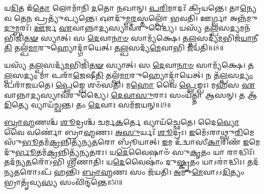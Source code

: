 𑌯\-\ul{𑌦𑌿}\-𑌤 𑌇᳴\-\ul{𑌤𑍋} 𑌲𑍋𑌮𑌾᳴𑌨𑌿 \ul{𑌦}\-𑌤𑍋 \ul{𑌨}\-𑌖𑌾𑌨𑍍।
\-\ul{𑌪}\-\-\ul{𑌰𑌿}\-𑌮𑌾𑌦𑌃᳴ 𑌕𑍍𑌰𑌿𑌯𑌨𑍍𑌤𑍇।
𑌤𑌾\-\ul{𑌨𑍍𑌯𑍇}\-𑌵 𑌤𑍇\-\ul{𑌨} 𑌪𑍍𑌰𑌤𑍍𑌯𑍁᳴𑌪𑍍𑌯𑌨𑍍𑌤𑍇।
𑌔𑌦𑍁᳴𑌮𑍍𑌬\-\ul{𑌰}\-𑌸𑍍𑌤𑌲𑍍𑌪𑍋᳴ 𑌭𑌵𑌤𑌿।
𑌊𑌰𑍍𑌗𑍍𑌵𑌾 𑌅𑌨𑍍𑌨᳴𑌮𑍁\-\ul{𑌦𑍁}\-𑌮𑍍𑌬𑌰𑌃᳴।
\-\ul{𑌊}\-𑌰𑍍𑌜 \ul{𑌏}\-𑌵𑌾𑌨𑍍𑌨𑌾\-\ul{𑌦𑍍𑌯}\-𑌸𑍍𑌯𑌾𑌵᳴𑌰𑍁𑌦𑍍𑌧𑍍𑌯𑍈।
𑌯𑌸𑍍𑌯᳴ 𑌤\-\ul{𑌲𑍍𑌪}\-𑌸\-\ul{𑌦𑍍𑌯}\-𑌮𑌨᳴𑌭𑌿𑌜𑌿\-\ul{𑌤}\-\-\ul{𑍟} 𑌸𑍍𑌯𑌾𑌤𑍍।
𑌸 \ul{𑌦𑍇}\-𑌵𑌾\-\ul{𑌨𑌾}\-\-\ul{𑍞} 𑌸𑌾𑌮𑍍𑌯᳴𑌕𑍍𑌷𑍇।
\-\ul{𑌤}\-\-\ul{𑌲𑍍𑌪}\-𑌸𑌦𑍍𑌯᳴\-\ul{𑌮}\-𑌭𑌿𑌜᳴\-\ul{𑌯𑌾}\-𑌨𑍀\-\ul{𑌤𑌿} 𑌤𑌲𑍍𑌪᳴\-\ul{𑌮𑌾}\-𑌰𑍁𑌹𑍍𑌯𑍋𑌦𑍍𑌗𑌾᳴𑌯𑍇𑌤𑍍।
\-\ul{𑌤}\-\-\ul{𑌲𑍍𑌪}\-𑌸𑌦𑍍𑌯᳴\-\ul{𑌮𑍇}\-𑌵𑌾𑌭𑌿 𑌜᳴𑌯𑌤𑌿॥48॥

𑌯𑌸𑍍𑌯᳴ 𑌤\-\ul{𑌲𑍍𑌪}\-𑌸𑌦𑍍𑌯᳴\-\ul{𑌮}\-𑌭𑌿𑌜𑌿᳴\-\ul{𑌤}\-\-\ul{𑍟} 𑌸𑍍𑌯𑌾𑌤𑍍।
𑌸 \ul{𑌦𑍇}\-𑌵𑌾\-\ul{𑌨𑌾}\-\-\ul{𑍞} 𑌸𑌾𑌮𑍍𑌯᳴𑌕𑍍𑌷𑍇।
\-\ul{𑌤}\-\-\ul{𑌲𑍍𑌪}\-𑌸\-\ul{𑌦𑍍𑌯𑌂} 𑌮𑌾 𑌪𑌰𑌾᳴\-\ul{𑌜𑍇}\-𑌷𑍀\-\ul{𑌤𑌿} 𑌤𑌲𑍍𑌪᳴\-\ul{𑌮𑌾}\-𑌰𑍁𑌹𑍍𑌯𑍋𑌦𑍍𑌗𑌾᳴𑌯𑍇𑌤𑍍।
𑌨 𑌤᳴\-\ul{𑌲𑍍𑌪}\-𑌸\-\ul{𑌦𑍍𑌯𑌂} 𑌪𑌰𑌾᳴𑌜𑌯𑌤𑍇।
\-\ul{𑌪𑍍𑌲𑍇}\-𑌙𑍍𑌖𑍇 𑌶𑍞᳴𑌸𑌤𑌿।
𑌮\-\ul{𑌹𑍋} 𑌵𑍈 \ul{𑌪𑍍𑌲𑍇}\-𑌙𑍍𑌖𑌃।
𑌮𑌹᳴𑌸 \ul{𑌏}\-𑌵𑌾𑌨𑍍𑌨𑌾\-\ul{𑌦𑍍𑌯}\-𑌸𑍍𑌯𑌾𑌵᳴𑌰𑍁𑌦𑍍𑌧𑍍𑌯𑍈।
\-\ul{𑌦𑍇}\-\-\ul{𑌵𑌾}\-\-\ul{𑌸𑍁}\-𑌰𑌾𑌃 𑌸𑌂𑌯᳴𑌤𑍍𑌤𑌾 𑌆𑌸𑌨𑍍।
𑌤 𑌆᳴\-\ul{𑌦𑌿}\-𑌤𑍍𑌯𑍇 𑌵𑍍𑌯𑌾𑌯᳴𑌚𑍍𑌛𑌨𑍍𑌤।
𑌤𑌂 \ul{𑌦𑍇}\-𑌵𑌾𑌃 𑌸𑌮᳴𑌜𑌯𑌨𑍍॥49॥

\-\ul{𑌬𑍍𑌰𑌾}\-\-\ul{𑌹𑍍𑌮}\-𑌣𑌶𑍍𑌚᳴ \ul{𑌶𑍂}\-𑌦𑍍𑌰𑌶𑍍𑌚᳴ 𑌚𑌰𑍍𑌮\-\ul{𑌕}\-𑌰𑍍𑌤𑍇 𑌵𑍍𑌯𑌾𑌯᳴𑌚𑍍𑌛𑍇𑌤𑍇।
𑌦𑍈\-\ul{𑌵𑍍𑌯𑍋} 𑌵𑍈 𑌵𑌰𑍍𑌣𑍋॑ 𑌬𑍍𑌰𑌾\-\ul{𑌹𑍍𑌮}\-𑌣𑌃।
\-\ul{𑌅}\-\-\ul{𑌸𑍁}\-𑌰𑍍𑌯𑌃᳴ \ul{𑌶𑍂}\-𑌦𑍍𑌰𑌃।
\-\ul{𑌇}\-𑌮𑍇᳴\-𑌽𑌰𑌾𑌥𑍍𑌸𑍁\-\ul{𑌰𑌿}\-𑌮𑍇 𑌸𑍁᳴\-\ul{𑌭𑍂}\-𑌤𑌮᳴\-\ul{𑌕𑍍𑌰}\-𑌨𑍍𑌨𑌿𑌤𑍍𑌯᳴𑌨𑍍𑌯\-\ul{𑌤}\-𑌰𑍋 𑌬𑍍𑌰𑍂᳴𑌯𑌾𑌤𑍍।
\-\ul{𑌇}\-𑌮 𑌉᳴𑌦𑍍𑌵𑌾𑌸𑍀\-\ul{𑌕𑌾}\-𑌰𑌿𑌣᳴ \ul{𑌇}\-𑌮𑍇 𑌦𑍁᳴\-\ul{𑌰𑍍𑌭𑍂}\-𑌤𑌮᳴\-\ul{𑌕𑍍𑌰}\-𑌨𑍍𑌨𑌿𑌤𑍍𑌯᳴𑌨𑍍𑌯\-\ul{𑌤}\-𑌰𑌃।
𑌯\-\ul{𑌦𑍇}\-𑌵𑍈𑌷𑌾𑍞᳴ 𑌸𑍁\-\ul{𑌕𑍃}\-𑌤𑌂 𑌯𑌾 𑌰𑌾𑌦𑍍𑌧𑌿𑌃᳴।
𑌤𑌦᳴𑌨𑍍𑌯\-\ul{𑌤}\-𑌰𑍋᳴𑌽𑌭𑌿 𑌶𑍍𑌰𑍀᳴𑌣𑌾𑌤𑌿।
𑌯\-\ul{𑌦𑍇}\-𑌵𑍈𑌷𑌾𑌂॑ 𑌦𑍁\-\ul{𑌷𑍍𑌕𑍃}\-𑌤𑌂 𑌯𑌾𑌽𑌰𑌾॑𑌦𑍍𑌧𑌿𑌃।
𑌤𑌦᳴𑌨𑍍𑌯\-\ul{𑌤}\-𑌰𑍋𑌽𑌪᳴ 𑌹𑌨𑍍𑌤𑌿।
\-\ul{𑌬𑍍𑌰𑌾}\-\-\ul{𑌹𑍍𑌮}\-𑌣𑌃 𑌸𑌂 𑌜᳴𑌯𑌤𑌿।
\-\ul{𑌅}\-𑌮𑍁\-\ul{𑌮𑍇}\-𑌵𑌾𑌽𑌽\-\ul{𑌦𑌿}\-𑌤𑍍𑌯𑌂 𑌭𑍍𑌰𑌾𑌤𑍃᳴𑌵𑍍𑌯\-\ul{𑌸𑍍𑌯} 𑌸𑌂𑌵𑌿᳴𑌨𑍍𑌦𑌨𑍍𑌤𑍇॥50॥




